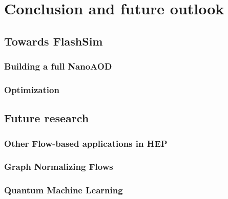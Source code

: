 \chapter{Conclusion and future outlook}\label{ch:outlook} %

\section{Towards FlashSim}

\subsection{Building a full NanoAOD}

\subsection{Optimization}

\section{Future research}

\subsection{Other Flow-based applications in HEP}

\subsection{Graph Normalizing Flows}

\subsection{Quantum Machine Learning}